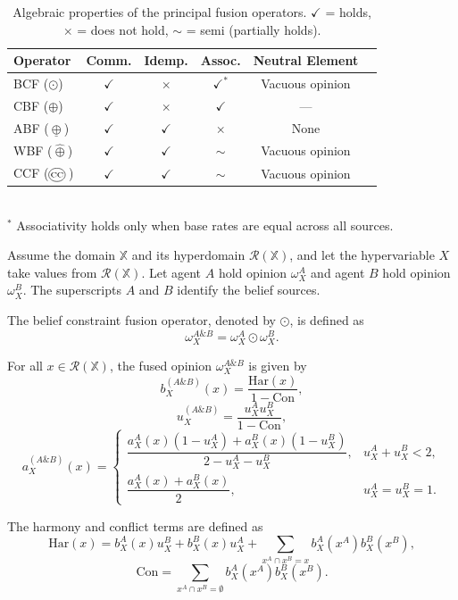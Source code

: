 \begin{table}[t]
\centering
\caption{Algebraic properties of the principal  fusion operators.
$\checkmark$ = holds, $\times$ = does not hold, $\sim$ = semi (partially holds).}
\label{tab:fusion_properties}
\setlength{\tabcolsep}{6pt}
\renewcommand{\arraystretch}{1.3}
\begin{tabular}{lccccl}
\toprule
\textbf{Operator} & \textbf{Comm.} & \textbf{Idemp.} & \textbf{Assoc.} & \textbf{Neutral Element} \\
\midrule
\acs{BCF}  ($\odot$)         & $\checkmark$ & $\times$ & $\checkmark^{*}$ & Vacuous opinion \\
\acs{CBF} ($\oplus$)       & $\checkmark$ & $\times$ & $\checkmark$     & --- \\
\acs{ABF}  ($\underline{\oplus}$) & $\checkmark$ & $\checkmark$ & $\times$ & None \\
\acs{WBF}  ($\hat{\oplus}$)  & $\checkmark$ & $\checkmark$ & $\sim$          & Vacuous opinion \\
\acs{CCF}  ($\occ$)   & $\checkmark$ & $\checkmark$ & $\sim$          & Vacuous opinion \\
\bottomrule
\end{tabular}
\\[4pt]
\footnotesize $^{*}$ Associativity holds only when base rates are equal across all sources.
\end{table}

\begin{definition}
\label{def:constraint_fuse}
Assume the domain $\mathbb{X}$ and its hyperdomain $\mathcal{R}(\mathbb{X})$, and let the hypervariable $X$ take values from $\mathcal{R}(\mathbb{X})$.
Let agent $A$ hold opinion $\omega_X^A$ and agent $B$ hold opinion $\omega_X^B$.
The superscripts $A$ and $B$ identify the belief sources.

The belief constraint fusion operator, denoted by $\odot$, is defined as
\[
\omega_X^{A\&B} = \omega_X^A \odot \omega_X^B .
\]

For all $x \in \mathcal{R}(\mathbb{X})$, the fused opinion $\omega_X^{A\&B}$ is given by
\[
b_X^{(A\&B)}(x) = \frac{\mathrm{Har}(x)}{1-\mathrm{Con}},
\]
\[
u_X^{(A\&B)} = \frac{u_X^A u_X^B}{1-\mathrm{Con}},
\]
\[
a_X^{(A\&B)}(x) =
\begin{cases}
\dfrac{a_X^A(x)(1-u_X^A)+a_X^B(x)(1-u_X^B)}{2-u_X^A-u_X^B}, & u_X^A+u_X^B<2,\\[1em]
\dfrac{a_X^A(x)+a_X^B(x)}{2}, & u_X^A=u_X^B=1.
\end{cases}
\]

The harmony and conflict terms are defined as
\[
\mathrm{Har}(x)= b_X^A(x)u_X^B + b_X^B(x)u_X^A
+ \sum_{x^A\cap x^B=x} b_X^A(x^A)b_X^B(x^B),
\]
\[
\mathrm{Con}=\sum_{x^A\cap x^B=\emptyset} b_X^A(x^A)b_X^B(x^B).
\]
\end{definition}


